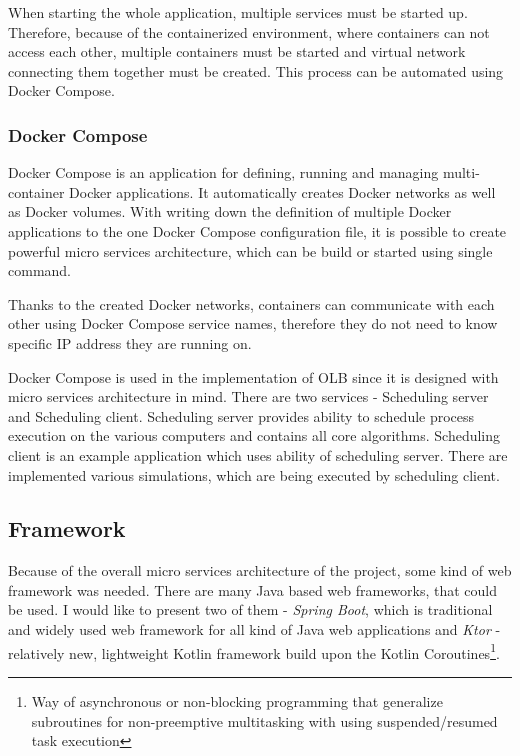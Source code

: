 When starting the whole application, 
multiple services must be started up.
Therefore, because of the containerized environment,
where containers can not access each other,
multiple containers must be started and virtual network connecting them together must be created.
This process can be automated using Docker Compose.

\subsubsection{Docker Compose}
Docker Compose\cite{dockerComposeReference} is an application for defining, running and managing multi-container Docker applications.
It automatically creates Docker networks as well as Docker volumes.
With writing down the definition of multiple Docker applications to the one Docker Compose configuration file,
it is possible to create powerful micro services architecture, 
which can be build or started using single command.

Thanks to the created Docker networks,
containers can communicate with each other using Docker Compose service names,
therefore they do not need to know specific IP address they are running on.

Docker Compose is used in the implementation of OLB since it is designed with micro services architecture in mind.
There are two services - Scheduling server and Scheduling client.
Scheduling server provides ability to schedule process execution on the various computers
and contains all core algorithms.
Scheduling client is an example application which uses ability of scheduling server. 
There are implemented various simulations,
which are being executed by scheduling client.  

\subsection{Framework}\label{subsec:framework}
Because of the overall micro services architecture of the project,
some kind of web framework was needed.
There are many Java based web frameworks,
that could be used. 
I would like to present two of them - \textit{Spring Boot}, 
which is traditional and widely used web framework for all kind of Java web applications
and \textit{Ktor} - relatively new, 
lightweight Kotlin framework build upon the Kotlin Coroutines\footnote{Way of asynchronous or non-blocking programming
that generalize subroutines for non-preemptive multitasking with using suspended/resumed task execution}.


